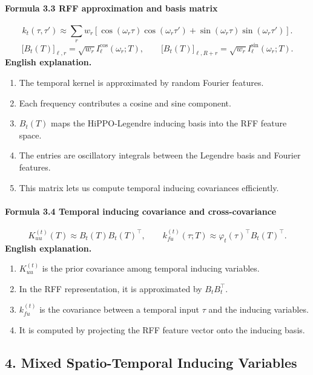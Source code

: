 \documentclass[12pt]{article}
\begin{document}
\paragraph{Formula 3.3 RFF approximation and basis matrix}
\[
k_t(\tau,\tau')\approx
\sum_r w_r[
\cos(\omega_r\tau)\cos(\omega_r\tau')
+
\sin(\omega_r\tau)\sin(\omega_r\tau')
].
\]
\[
\big[B_t(T)\big]_{\ell,r}=\sqrt{w_r}I_\ell^{\cos}(\omega_r;T),
\qquad
\big[B_t(T)\big]_{\ell,R+r}=\sqrt{w_r}I_\ell^{\sin}(\omega_r;T).
\]
\textbf{English explanation.}
\begin{enumerate}[leftmargin=2em]
\item The temporal kernel is approximated by random Fourier features.
\item Each frequency contributes a cosine and sine component.
\item \(B_t(T)\) maps the HiPPO-Legendre inducing basis into the RFF feature space.
\item The entries are oscillatory integrals between the Legendre basis and Fourier features.
\item This matrix lets us compute temporal inducing covariances efficiently.
\end{enumerate}

\paragraph{Formula 3.4 Temporal inducing covariance and cross-covariance}
\[
K_{uu}^{(t)}(T)\approx B_t(T)B_t(T)^\top,
\qquad
k_{fu}^{(t)}(\tau;T)\approx \varphi_t(\tau)^\top B_t(T)^\top.
\]
\textbf{English explanation.}
\begin{enumerate}[leftmargin=2em]
\item \(K_{uu}^{(t)}\) is the prior covariance among temporal inducing variables.
\item In the RFF representation, it is approximated by \(B_tB_t^\top\).
\item \(k_{fu}^{(t)}\) is the covariance between a temporal input \(\tau\) and the inducing variables.
\item It is computed by projecting the RFF feature vector onto the inducing basis.
\end{enumerate}

\subsection{4. Mixed Spatio-Temporal Inducing Variables}
\end{document}
